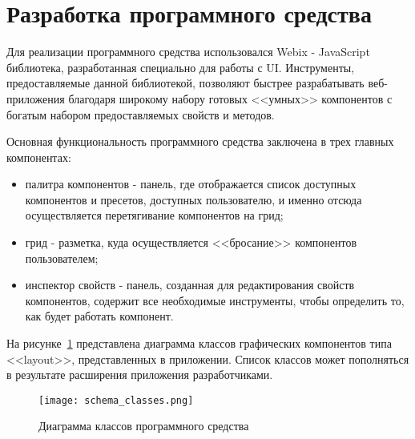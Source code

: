 \section{Разработка программного средства} 
\label{sec:development}

Для реализации программного средства использовался Webix - JavaScript библиотека, разработанная специально для работы с UI. Инструменты, предоставляемые данной библиотекой, позволяют быстрее разрабатывать веб-приложения благодаря широкому набору готовых <<умных>> компонентов с богатым набором предоставляемых свойств и методов.

Основная функциональность программного средства заключена в трех главных компонентах: 
\begin{itemize}
	\item палитра компонентов - панель, где отображается список доступных компонентов и пресетов, доступных пользователю, и именно отсюда осуществляется перетягивание компонентов на грид;
	\item грид - разметка, куда осуществляется <<бросание>> компонентов пользователем;
	\item инспектор свойств - панель, созданная для редактирования свойств компонентов, содержит все необходимые инструменты, чтобы определить то, как будет работать компонент.
\end{itemize}
  
На рисунке~\ref{sec:development:schema_classes} представлена диаграмма классов графических компонентов типа <<layout>>, представленных в приложении. Список классов может пополняться в результате расширения приложения разработчиками.\pagebreak

\begin{figure}[ht]
  \centering
    \texttt{[image: schema\_classes.png]}
    \caption{Диаграмма классов программного средства}
    \label{sec:development:schema_classes}
\end{figure}







